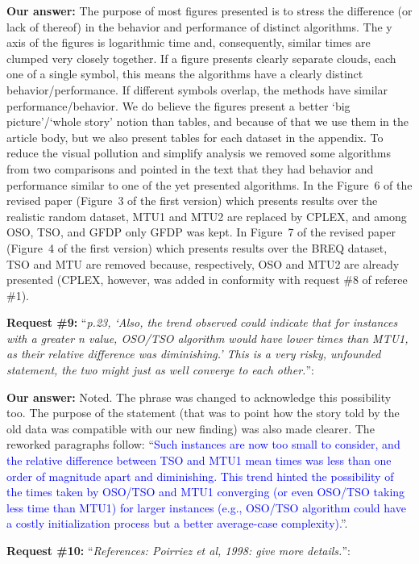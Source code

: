 \documentclass{elsarticle}
\begin{document}
\textbf{Our answer:} The purpose of most figures presented is to stress the difference (or lack of thereof) in the behavior and performance of distinct algorithms. The y axis of the figures is logarithmic time and, consequently, similar times are clumped very closely together. If a figure presents clearly separate clouds, each one of a single symbol, this means the algorithms have a clearly distinct behavior/performance. If different symbols overlap, the methods have similar performance/behavior. We do believe the figures present a better `big picture'/`whole story' notion than tables, and because of that we use them in the article body, but we also present tables for each dataset in the appendix. To reduce the visual pollution and simplify analysis we removed some algorithms from two comparisons and pointed in the text that they had behavior and performance similar to one of the yet presented algorithms. In the Figure~6 of the revised paper (Figure~3 of the first version) which presents results over the realistic random dataset, MTU1 and MTU2 are replaced by CPLEX, and among OSO, TSO, and GFDP only GFDP was kept. In Figure~7 of the revised paper (Figure~4 of the first version) which presents results over the BREQ dataset, TSO and MTU are removed because, respectively, OSO and MTU2 are already presented (CPLEX, however, was added in conformity with request \#8 of referee \#1).
\medskip

\textbf{Request \#9:} ``\textit{p.23, `Also, the trend observed could indicate that for instances with a greater n value, OSO/TSO algorithm would have lower times than MTU1, as their relative difference was diminishing.' This is a very risky, unfounded statement, the two might just as well converge to each other.}'':

\textbf{Our answer:} Noted. The phrase was changed to acknowledge this possibility too. The purpose of the statement (that was to point how the story told by the old data was compatible with our new finding) was also made clearer. The reworked paragraphs follow: ``\textcolor{blue}{Such instances are now too small to consider, and the relative difference between TSO and MTU1 mean times was less than one order of magnitude apart and diminishing. This trend hinted the possibility of the times taken by OSO/TSO and MTU1 converging (or even OSO/TSO taking less time than MTU1) for larger instances (e.g., OSO/TSO algorithm could have a costly initialization process but a better average-case complexity).}''.
\medskip

\textbf{Request \#10:} ``\textit{References: Poirriez et al, 1998: give more details.}'':
\end{document}
